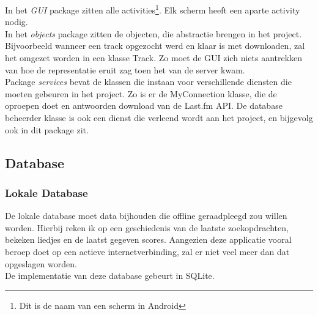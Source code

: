 \documentclass[11pt,a4paper]{article}
\begin{document}
		 In het \textit{GUI} package zitten alle activities\footnote{Dit is de naam van een scherm in Android}. Elk scherm heeft een aparte activity nodig. \\
		In het \textit{objects} package zitten de objecten, die abstractie brengen in het project. Bijvoorbeeld wanneer een track opgezocht werd en klaar is met downloaden, zal het omgezet worden in een klasse Track. Zo moet de GUI zich niets aantrekken van hoe de representatie eruit zag toen het van de server kwam. \\
		Package \textit{services} bevat de klassen die instaan voor verschillende diensten die moeten gebeuren in het project. Zo is er de MyConnection klasse, die de oproepen doet en antwoorden download van de Last.fm API. De database beheerder klasse is ook een dienst die verleend wordt aan het project, en bijgevolg ook in dit package zit.
	\subsection{Database}
	\subsubsection{Lokale Database}
	De lokale database moet data bijhouden die offline geraadpleegd zou willen worden. Hierbij reken ik op een geschiedenis van de laatste zoekopdrachten, bekeken liedjes en de laatst gegeven scores. Aangezien deze applicatie vooral beroep doet op een actieve internetverbinding, zal er niet veel meer dan dat opgeslagen worden. \\
	 De implementatie van deze database gebeurt in SQLite.
	 
\end{document}
